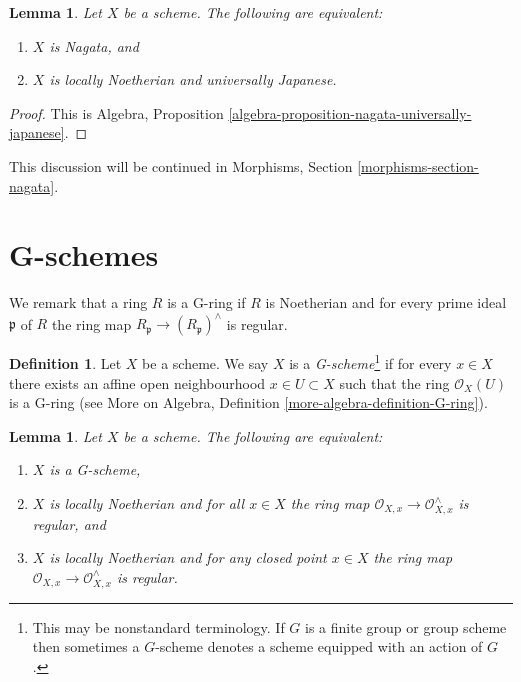\documentclass{stacks-project}
\theoremstyle{plain}
\newtheorem{lemma}[subsection]{Lemma}
\theoremstyle{definition}
\newtheorem{definition}[subsection]{Definition}
\theoremstyle{remark}
\numberwithin{equation}{subsection}
\begin{document}
\begin{lemma}
\label{lemma-nagata-universally-Japanese}
Let $X$ be a scheme.
The following are equivalent:
\begin{enumerate}
\item $X$ is Nagata, and
\item $X$ is locally Noetherian and universally Japanese.
\end{enumerate}
\end{lemma}

\begin{proof}
This is
Algebra, Proposition \ref{algebra-proposition-nagata-universally-japanese}.
\end{proof}

\noindent
This discussion will be continued in
Morphisms, Section \ref{morphisms-section-nagata}.



\section{G-schemes}
\label{section-G-scheme}

\noindent
We remark that a ring $R$ is a G-ring if $R$ is Noetherian and
for every prime ideal $\mathfrak p$ of $R$ the ring map
$R_\mathfrak p \to (R_\mathfrak p)^\wedge$ is regular.

\begin{definition}
\label{definition-G-scheme}
Let $X$ be a scheme. We say $X$ is a {\it G-scheme}\footnote{This may be
nonstandard terminology. If $G$ is a finite group or group scheme
then sometimes a $G$-scheme denotes a scheme equipped with an
action of $G$.} if for every $x \in X$ there exists an affine
open neighbourhood $x \in U \subset X$ such that the ring
$\mathcal{O}_X(U)$ is a G-ring (see
More on Algebra, Definition \ref{more-algebra-definition-G-ring}).
\end{definition}

\begin{lemma}
\label{lemma-characterize-G-scheme}
Let $X$ be a scheme. The following are equivalent:
\begin{enumerate}
\item $X$ is a G-scheme,
\item $X$ is locally Noetherian and for all $x \in X$ the ring
map $\mathcal{O}_{X, x} \to \mathcal{O}_{X, x}^\wedge$ is regular, and
\item $X$ is locally Noetherian and for any closed point $x \in X$
the ring map $\mathcal{O}_{X, x} \to \mathcal{O}_{X, x}^\wedge$ is regular.
\end{enumerate}
\end{lemma}
\end{document}
